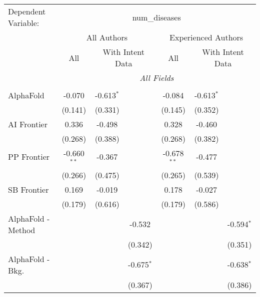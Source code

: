 \begingroup
\centering
\begin{tabular}{lcccccc}
   \tabularnewline \midrule \midrule
   Dependent Variable: & \multicolumn{6}{c}{num\_diseases}\\
 & \multicolumn{3}{c}{All Authors} & \multicolumn{3}{c}{Experienced Authors} \\
\cmidrule(lr){2-4} \cmidrule(lr){5-7}
 & \multicolumn{1}{c}{All} & \multicolumn{2}{c}{With Intent Data} & \multicolumn{1}{c}{All} & \multicolumn{2}{c}{With Intent Data} \\
\cmidrule(lr){2-2} \cmidrule(lr){3-4} \cmidrule(lr){5-5} \cmidrule(lr){6-7}
 & \multicolumn{6}{c}{\textit{All Fields}} \\ \\
   AlphaFold            & -0.070        & -0.613$^{*}$ &               & -0.084        & -0.613$^{*}$ &   \\   
                        & (0.141)       & (0.331)      &               & (0.145)       & (0.352)      &   \\   
   AI Frontier          & 0.336         & -0.498       &               & 0.328         & -0.460       &   \\   
                        & (0.268)       & (0.388)      &               & (0.268)       & (0.382)      &   \\   
   PP Frontier          & -0.660$^{**}$ & -0.367       &               & -0.678$^{**}$ & -0.477       &   \\   
                        & (0.266)       & (0.475)      &               & (0.265)       & (0.539)      &   \\   
   SB Frontier          & 0.169         & -0.019       &               & 0.178         & -0.027       &   \\   
                        & (0.179)       & (0.616)      &               & (0.179)       & (0.586)      &   \\   
   AlphaFold - Method   &               &              & -0.532        &               &              & -0.594$^{*}$\\   
                        &               &              & (0.342)       &               &              & (0.351)\\   
   AlphaFold - Bkg.     &               &              & -0.675$^{*}$  &               &              & -0.638$^{*}$\\   
                        &               &              & (0.367)       &               &              & (0.386)\\   

\end{tabular}

